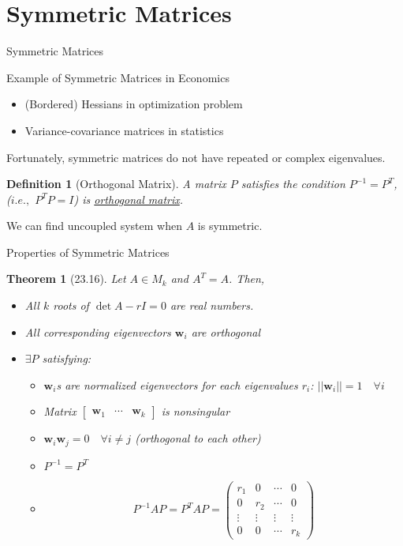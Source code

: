 \documentclass[a4paper,11pt]{article}
\newtheorem{defn}{Definition}
\newtheorem{thm}{Theorem}
\newcommand{\bd}{\mathbf}
\begin{document}
\section{Symmetric Matrices} %
\label{sec:symmetric_matrices}
\begin{frame}[t]{Symmetric Matrices}
	\begin{block}
		{Example of Symmetric Matrices in Economics}
		\begin{itemize}
			\item (Bordered) Hessians in optimization problem
			\item Variance-covariance matrices in statistics
		\end{itemize}
		Fortunately, symmetric matrices do not have repeated or complex eigenvalues. 
	\end{block}
	\begin{defn}
		[Orthogonal Matrix] A matrix $P$ satisfies the condition $P^{-1}=P^T$, ($i.e.,$ $P^T P = I$) is \uline{orthogonal matrix}.
	\end{defn}
	We can find uncoupled system when $A$ is symmetric.
\end{frame}
\begin{frame}[t]{Properties of Symmetric Matrices}
	\begin{thm}
		[23.16] Let $A\in M_k$ and $A^T=A$. Then, 
		\begin{itemize}
			\item All $k$ roots of $\det{A-rI}=0$ are real numbers. 
			\item All corresponding eigenvectors $\bd{w}_i$ are orthogonal
			\item $\exists P$ satisfying:
			\begin{itemize}
				\item $\bd{w}_i$s are normalized eigenvectors for each eigenvalues $r_i$: $||\bd{w}_i||=1 \quad\forall i$
				\item Matrix $\begin{bmatrix}\bd{w}_1&\cdots&\bd{w}_k
				\end{bmatrix}$ is nonsingular
				\item $\bd{w}_i\bd{w}_j=0\quad \forall i\neq j$ (orthogonal to each other)
				\item $P^{-1}=P^T$
				\item \[
					P^{-1}AP = P^TAP = \begin{pmatrix}
						r_1 & 0 & \cdots & 0\\
						0 & r_2 & \cdots & 0\\
						\vdots & \vdots & \vdots & \vdots\\
						0 & 0 & \cdots & r_k
					\end{pmatrix}
				\]
			\end{itemize}
		\end{itemize}
	\end{thm}
\end{frame}
\end{document}
